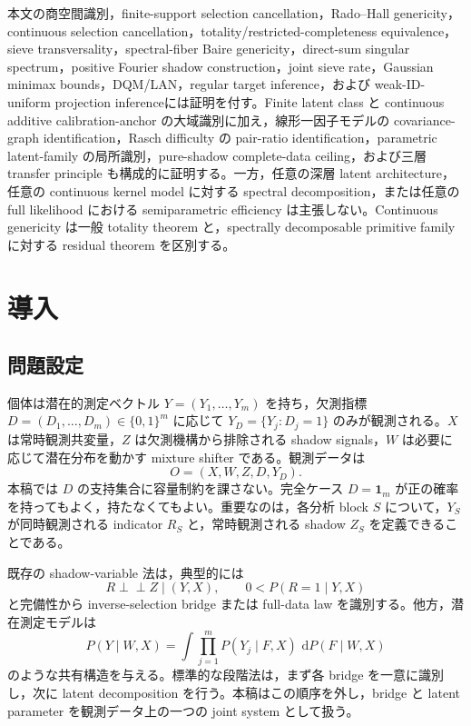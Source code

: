 \documentclass[11pt,a4paper]{ltjsarticle}
\theoremstyle{remark}
\newcommand{\ind}{\perp\!\!\!\perp}
\newcommand{\one}{\bm 1}
\newcommand{\dd}{\,\mathrm d}
\begin{document}
\begin{tcolorbox}[colback=softred,colframe=deepred,boxrule=.7pt,arc=2mm,title=理論メモとしての範囲]
本文の商空間識別，finite-support selection cancellation，Rado--Hall genericity，continuous selection cancellation，totality/restricted-completeness equivalence，sieve transversality，spectral-fiber Baire genericity，direct-sum singular spectrum，positive Fourier shadow construction，joint sieve rate，Gaussian minimax bounds，DQM/LAN，regular target inference，および weak-ID-uniform projection inferenceには証明を付す。Finite latent class と continuous additive calibration-anchor の大域識別に加え，線形一因子モデルの covariance-graph identification，Rasch difficulty の pair-ratio identification，parametric latent-family の局所識別，pure-shadow complete-data ceiling，および三層 transfer principle も構成的に証明する。一方，任意の深層 latent architecture，任意の continuous kernel model に対する spectral decomposition，または任意の full likelihood における semiparametric efficiency は主張しない。Continuous genericity は一般 totality theorem と，spectrally decomposable primitive family に対する residual theorem を区別する。
\end{tcolorbox}

\tableofcontents
\newpage

\section{導入}\label{sec:intro}

\subsection{問題設定}
個体は潜在的測定ベクトル $Y=(Y_1,\ldots,Y_m)$ を持ち，欠測指標 $D=(D_1,\ldots,D_m)\in\{0,1\}^m$ に応じて $Y_D=\{Y_j:D_j=1\}$ のみが観測される。$X$ は常時観測共変量，$Z$ は欠測機構から排除される shadow signals，$W$ は必要に応じて潜在分布を動かす mixture shifter である。観測データは
\[
O=(X,W,Z,D,Y_D).
\]
本稿では $D$ の支持集合に容量制約を課さない。完全ケース $D=\one_m$ が正の確率を持ってもよく，持たなくてもよい。重要なのは，各分析 block $S$ について，$Y_S$ が同時観測される indicator $R_S$ と，常時観測される shadow $Z_S$ を定義できることである。

既存の shadow-variable 法は，典型的には
\[
R\ind Z\mid(Y,X),\qquad 0<P(R=1\mid Y,X)
\]
と完備性から inverse-selection bridge または full-data law を識別する。他方，潜在測定モデルは
\[
P(Y\mid W,X)=\int\prod_{j=1}^mP(Y_j\mid F,X)\,\dd P(F\mid W,X)
\]
のような共有構造を与える。標準的な段階法は，まず各 bridge を一意に識別し，次に latent decomposition を行う。本稿はこの順序を外し，bridge と latent parameter を観測データ上の一つの joint system として扱う。
\end{document}
